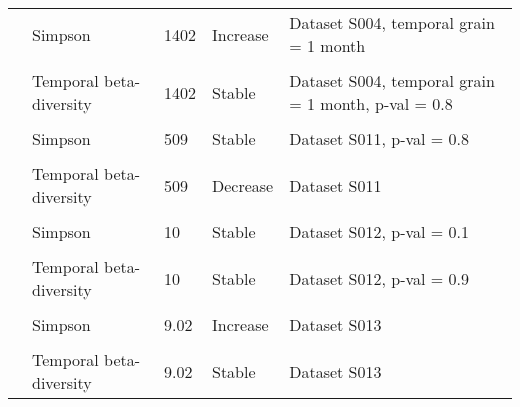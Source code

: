 \documentclass[
  12pt,
  oneside]{report}
\begin{document}
\begin{landscape}
\begin{longtable}[t]{llll>{\raggedright\arraybackslash}p{30em}}
\cite{pilotto_meta-analysis_2020} & Simpson & 1402 & Increase & Dataset S004, temporal grain = 1 month\\
\cellcolor{gray!6}{\cite{pilotto_meta-analysis_2020}} & \cellcolor{gray!6}{Abundance} & \cellcolor{gray!6}{1402} & \cellcolor{gray!6}{Decrease} & \cellcolor{gray!6}{Dataset S004, temporal grain = 1 month}\\
\cite{pilotto_meta-analysis_2020} & Temporal beta-diversity & 1402 & Stable & Dataset S004, temporal grain = 1 month, p-val = 0.8\\
\addlinespace
\cellcolor{gray!6}{\cite{pilotto_meta-analysis_2020}} & \cellcolor{gray!6}{SR} & \cellcolor{gray!6}{509} & \cellcolor{gray!6}{Increase} & \cellcolor{gray!6}{Dataset S011}\\
\cite{pilotto_meta-analysis_2020} & Simpson & 509 & Stable & Dataset S011, p-val = 0.8\\
\cellcolor{gray!6}{\cite{pilotto_meta-analysis_2020}} & \cellcolor{gray!6}{Abundance} & \cellcolor{gray!6}{509} & \cellcolor{gray!6}{Increase} & \cellcolor{gray!6}{Dataset S011}\\
\cite{pilotto_meta-analysis_2020} & Temporal beta-diversity & 509 & Decrease & Dataset S011\\
\cellcolor{gray!6}{\cite{pilotto_meta-analysis_2020}} & \cellcolor{gray!6}{SR} & \cellcolor{gray!6}{10} & \cellcolor{gray!6}{Increase} & \cellcolor{gray!6}{Dataset S012}\\
\addlinespace
\cite{pilotto_meta-analysis_2020} & Simpson & 10 & Stable & Dataset S012, p-val = 0.1\\
\cellcolor{gray!6}{\cite{pilotto_meta-analysis_2020}} & \cellcolor{gray!6}{Abundance} & \cellcolor{gray!6}{10} & \cellcolor{gray!6}{Stable} & \cellcolor{gray!6}{Dataset S012, p-val = 0.22}\\
\cite{pilotto_meta-analysis_2020} & Temporal beta-diversity & 10 & Stable & Dataset S012, p-val = 0.9\\
\cellcolor{gray!6}{\cite{pilotto_meta-analysis_2020}} & \cellcolor{gray!6}{SR} & \cellcolor{gray!6}{9.02} & \cellcolor{gray!6}{Increase} & \cellcolor{gray!6}{Dataset S013}\\
\cite{pilotto_meta-analysis_2020} & Simpson & 9.02 & Increase & Dataset S013\\
\addlinespace
\cellcolor{gray!6}{\cite{pilotto_meta-analysis_2020}} & \cellcolor{gray!6}{Abundance} & \cellcolor{gray!6}{9.02} & \cellcolor{gray!6}{Stable} & \cellcolor{gray!6}{Dataset S013}\\
\cite{pilotto_meta-analysis_2020} & Temporal beta-diversity & 9.02 & Stable & Dataset S013\\

\end{longtable}
\end{landscape}
\end{document}
